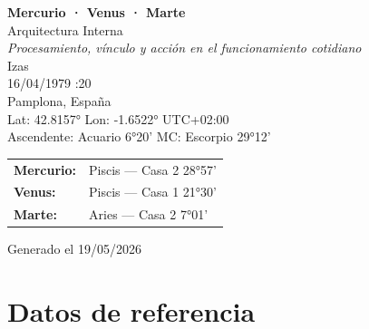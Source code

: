 \documentclass[11pt,a4paper]{article}
\begin{document}

\begin{titlepage}
  \centering

  \vspace*{2cm}

  {\Huge\bfseries\color{azulai} Mercurio · Venus · Marte}\\[0.6cm]

  {\large\color{grisai} Arquitectura Interna}\\[0.4cm]

  {\small\itshape\color{grisai}
  Procesamiento, vínculo y acción en el funcionamiento cotidiano
  }\\[2.2cm]

  {\huge\color{doradoai} Izas}\\[1.6cm]

  {\Large 16/04/1979 :20}\\[0.35cm]

  {\Large Pamplona, España}\\[0.35cm]

  {\normalsize
  Lat: 42.8157° \quad
  Lon: -1.6522° \quad
  UTC+02:00
  }\\[0.35cm]

  {\normalsize
  Ascendente: Acuario 6°20'
  \quad
  MC: Escorpio 29°12'
  }\\[2.2cm]

  \renewcommand{\arraystretch}{1.35}

  \begin{tabular}{ll}
    \textbf{Mercurio:} & Piscis — Casa 2 28°57' \\
    \textbf{Venus:}    & Piscis — Casa 1 21°30' \\
    \textbf{Marte:}    & Aries — Casa 2 7°01' \\
  \end{tabular}

  \vfill

  {\small\color{grisai}
  Generado el 19/05/2026
  }

\end{titlepage}

\RaggedRight

\tableofcontents

\clearpage

\section{Datos de referencia}
\end{document}
